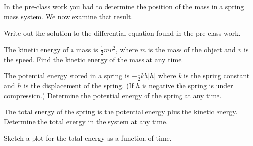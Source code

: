   \begin{problem}
  \item In the pre-class work you had to determine the position of the
    mass in a spring mass system. We now examine that result.
    \begin{subproblem}
    \item Write out the solution to the differential equation found in
      the pre-class work.
      \vspace{2em}
    \item The kinetic energy of a mass is $\frac{1}{2} m v^2$, where
      $m$ is the mass of the object and $v$ is the speed. Find the
      kinetic energy of the mass at any time.
      \vfill

    \clearpage

  \item The potential energy stored in a spring is $-\frac{1}{2} k h |h|$
    where $k$ is the spring constant and $h$ is the displacement of
    the spring. (If $h$ is negative the spring is under compression.)
    Determine the potential energy of the spring at any time.
    \vfill

  \item The total energy of the spring is the potential energy plus
    the kinetic energy. Determine the total energy in the system at
    any time. 

    \vfill

  \item Sketch a plot for the total energy as a function of time.
    \vfill


  \end{subproblem}



\end{problem}

